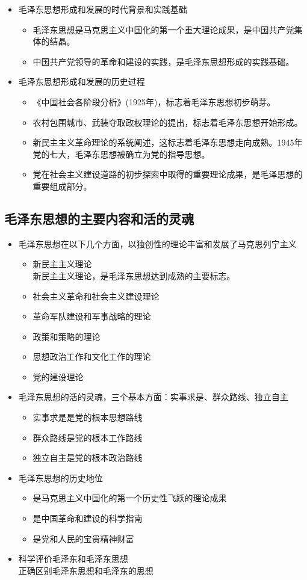 \begin{itemize}
	\item 毛泽东思想形成和发展的时代背景和实践基础\\
	\begin{itemize}
		\item 毛泽东思想是马克思主义中国化的第一个重大理论成果，是中国共产党集体的结晶。
		\item 中国共产党领导的革命和建设的实践，是毛泽东思想形成的实践基础。
	\end{itemize}
	\item 毛泽东思想形成和发展的历史过程
	\begin{itemize}
		\item 《中国社会各阶段分析》(1925年)，标志着毛泽东思想初步萌芽。
		\item 农村包围城市、武装夺取政权理论的提出，标志着毛泽东思想开始形成。
		\item 新民主主义革命理论的系统阐述，这标志着毛泽东思想走向成熟。1945年党的七大，毛泽东思想被确立为党的指导思想。
		\item 党在社会主义建设道路的初步探索中取得的重要理论成果，是毛泽思想的重要组成部分。
	\end{itemize}
\end{itemize}
\subsection{毛泽东思想的主要内容和活的灵魂}
\begin{itemize}
	\item 毛泽东思想在以下几个方面，以独创性的理论丰富和发展了马克思列宁主义
	\begin{itemize}
	\item 新民主主义理论\\
	新民主主义理论，是毛泽东思想达到成熟的主要标志。
	\item 社会主义革命和社会主义建设理论 
	\item 革命军队建设和军事战略的理论
	\item 政策和策略的理论
	\item 思想政治工作和文化工作的理论
	\item 党的建设理论
	\end{itemize}
	\item 毛泽东思想的活的灵魂，三个基本方面：实事求是、群众路线、独立自主
	\begin{itemize}
		\item 实事求是是党的根本思想路线
		\item 群众路线是党的根本工作路线
		\item 独立自主是党的根本政治路线
	\end{itemize}
	\item 毛泽东思想的历史地位
	\begin{itemize}
		\item 是马克思主义中国化的第一个历史性飞跃的理论成果
		\item 是中国革命和建设的科学指南
		\item 是党和人民的宝贵精神财富
		
	\end{itemize}
		\item 科学评价毛泽东和毛泽东思想\\
		正确区别毛泽东思想和毛泽东的思想
\end{itemize}
